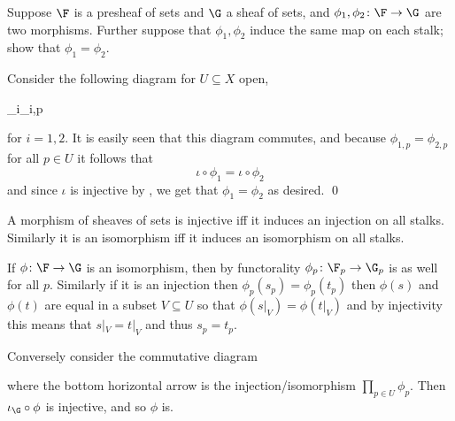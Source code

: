 \bprop[name={stalksdeterminemorphism}]

    Suppose $\F$ is a presheaf of sets and $\G$ a sheaf of sets, and $\phi_1,\phi_2\colon\F\to\G$ are two morphisms.
    Further suppose that $\phi_1,\phi_2$ induce the same map on each stalk; show that $\phi_1=\phi_2$.

\eprop

\bproof

    Consider the following diagram for $U\subseteq X$ open,

        {\phi_i}{\prod\phi_{i,p}}{}{\iota}

    for $i=1,2$.
    It is easily seen that this diagram commutes, and because $\phi_{1,p}=\phi_{2,p}$ for all $p\in U$ it follows that
    $$ \iota\circ\phi_1 = \iota\circ\phi_2 $$
    and since $\iota$ is injective by , we get that $\phi_1=\phi_2$ as desired.
    \qed

\eproof

\bprop[name={isoonstalks}]

    A morphism of sheaves of sets is injective iff it induces an injection on all stalks.
    Similarly it is an isomorphism iff it induces an isomorphism on all stalks.

\eprop

\bproof

    If $\phi\colon\F\to\G$ is an isomorphism, then by functorality $\phi_p\colon\F_p\to\G_p$ is as well for all $p$.
    Similarly if it is an injection then $\phi_p(s_p)=\phi_p(t_p)$ then $\phi(s)$ and $\phi(t)$ are equal in a subset $V\subseteq U$ so that
    $\phi(s|_V)=\phi(t|_V)$ and by injectivity this means that $s|_V=t|_V$ and thus $s_p=t_p$.

    Conversely consider the commutative diagram


    where the bottom horizontal arrow is the injection/isomorphism $\prod_{p\in U}\phi_p$.
    Then $\iota_\G\circ\phi$ is injective, and so $\phi$ is.

